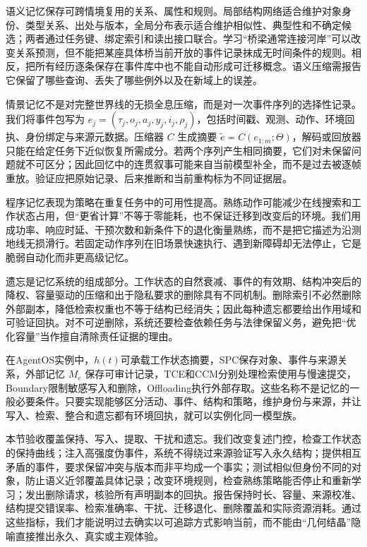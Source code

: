 语义记忆保存可跨情境复用的关系、属性和规则。局部结构网络适合维护对象身份、类型关系、出处与版本，全局分布表示适合维护相似性、典型性和不确定候选；两者通过任务键、绑定索引和读出接口联合。学习“桥梁通常连接河岸”可以改变关系预测，但不能把某座具体桥当前开放的事件记录抹成无时间条件的规则。相反，把所有经历逐条保存在事件库中也不能自动形成可迁移概念。语义压缩需报告它保留了哪些查询、丢失了哪些例外以及在新域上的误差。

情景记忆不是对完整世界线的无损全息压缩，而是对一次事件序列的选择性记录。我们将事件包写为 $e_j=(\tau_j,o_j,a_j,y_j,i_j,\rho_j)$，包括时间戳、观测、动作、环境回执、身份绑定与来源元数据。压缩器 $C$ 生成摘要 $\tilde e=C(e_{1:m};\Theta)$，解码或回放器只能在给定任务下近似恢复所需成分。若两个序列产生相同摘要，它们对未保留问题就不可区分；因此回忆中的连贯叙事可能来自当前模型补全，而不是过去被逐帧重放。验证应把原始记录、后来推断和当前重构标为不同证据层。

程序记忆表现为策略在重复任务中的可用性提高。熟练动作可能减少在线搜索和工作状态占用，但“更省计算”不等于零能耗，也不保证迁移到改变后的环境。我们用成功率、响应时延、干预次数和新条件下的退化衡量熟练，而不是把它描述为沿测地线无损滑行。若固定动作序列在旧场景快速执行、遇到新障碍却无法停止，它是脆弱自动化而非更高级记忆。

遗忘是记忆系统的组成部分。工作状态的自然衰减、事件的有效期、结构冲突后的降权、容量驱动的压缩和出于隐私要求的删除具有不同机制。删除索引不必然删除外部副本，降低检索权重也不等于结构已经消失；因此每种遗忘都要给出作用域和可验证回执。对不可逆删除，系统还要检查依赖任务与法律保留义务，避免把“优化容量”当作擅自清除责任证据的理由。

在AgentOS实例中，$h(t)$可承载工作状态摘要，SPC保存对象、事件与来源关系，外部记忆 $M_e$ 保存可审计记录，TCE和CCM分别处理检索使用与慢速提交，Boundary限制敏感写入和删除，Offloading执行外部存取。这些名称不是记忆的一般必要条件。只要实现能够区分活动、事件、结构和策略，维护身份与来源，并让写入、检索、整合和遗忘都有环境回执，就可以实例化同一模型族。

本节验收覆盖保持、写入、提取、干扰和遗忘。我们改变复述门控，检查工作状态的保持曲线；注入高强度伪事件，系统不得绕过来源验证写入永久结构；提供相互矛盾的事件，要求保留冲突与版本而非平均成一个事实；测试相似但身份不同的对象，防止语义近邻覆盖具体记录；改变环境规则，检查熟练策略能否停止和重新学习；发出删除请求，核验所有声明副本的回执。报告保持时长、容量、来源校准、结构提交错误率、检索准确率、干扰、迁移退化、删除覆盖和实际资源消耗。通过这些指标，我们才能说明过去确实以可追踪方式影响当前，而不能由“几何结晶”隐喻直接推出永久、真实或主观体验。

